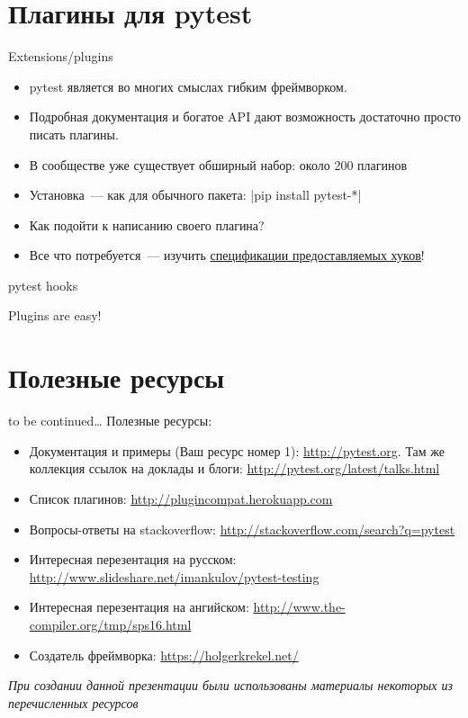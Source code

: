 \documentclass{beamer}
\begin{document}
\section{Плагины для pytest}
\begin{frame}[fragile]{Extensions/plugins}
    \begin{itemize}
    \item pytest является во многих смыслах гибким фреймворком.
    \pause \item Подробная документация и богатое API дают возможность достаточно просто писать плагины.
    \pause \item В сообществе уже существует обширный набор: около 200 плагинов
    \pause \item Установка~--- как для обычного пакета: |pip install pytest-*|
    \pause \item Как подойти к написанию своего плагина?
    \pause \item Все что потребуется~--- изучить \href{http://pytest.org/latest/writing_plugins.html\#pytest-hook-reference}{спецификации предоставляемых хуков}!
    \end{itemize}
\end{frame}

\begin{frame}[fragile]{pytest hooks}
\end{frame}

\begin{frame}[fragile]{Plugins are easy!}
\end{frame}

\section{Полезные ресурсы}
\begin{frame}[fragile]{to be continued\ldots}
    Полезные ресурсы:
    \begin{itemize}
    \item Документация и примеры (Ваш ресурс номер 1): \url{http://pytest.org}.
    Там же коллекция ссылок на доклады и блоги: \url{http://pytest.org/latest/talks.html}
    \item Список плагинов: \url{http://plugincompat.herokuapp.com}
    \item Вопросы-ответы на stackoverflow: \url{http://stackoverflow.com/search?q=pytest}
    \item Интересная перезентация на русском: \url{http://www.slideshare.net/imankulov/pytest-testing}
    \item Интересная перезентация на ангийском: \url{http://www.the-compiler.org/tmp/sps16.html}
    \item Создатель фреймворка: \url{https://holgerkrekel.net/}
    \end{itemize}
    \footnotesize\emph{При создании данной презентации были использованы материалы некоторых из перечисленных ресурсов}
\end{frame}
\end{document}
